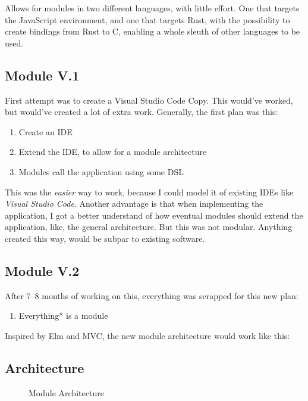 Allows for modules in two different languages, with little effort. One that
targets the JavaScript environment, and one that targets Rust, with the
possibility to create bindings from Rust to C, enabling a whole sleuth of other
languages to be used.



\subsection{Module V.1}

First attempt was to create a Visual Studio Code Copy. This would've worked, but
would've created a lot of extra work.
Generally, the first plan was this:
\begin{enumerate}
  \item Create an IDE
  \item Extend the IDE, to allow for a module architecture
  \item Modules call the application using some DSL
\end{enumerate}

This was the \textit{easier} way to work, because I could model it of existing
IDEs like \textit{Visual Studio Code}. Another advantage is that when
implementing the application, I got a better understand of how eventual modules
should extend the application, like, the general architecture. But this was not
modular. Anything created this way, would be subpar to existing software.

\subsection{Module V.2}


After 7–8 months of working on this, everything was scrapped for this new plan:
\begin{enumerate}
  \item Everything* is a module
\end{enumerate}

Inspired by Elm and MVC, the new module architecture would work like this:

\subsection{Architecture}
\begin{figure}
  \centering
  
  \caption{Module Architecture}
\end{figure}

